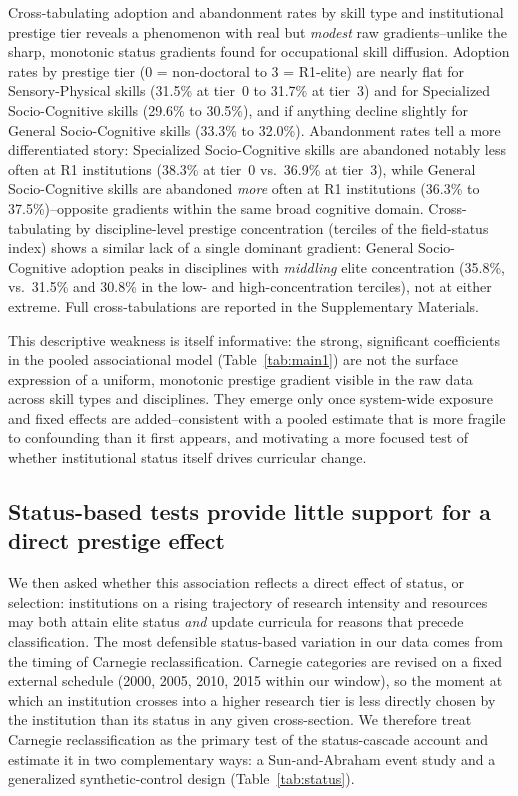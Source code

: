 \documentclass[11pt, letterpaper]{article}
\begin{document}
Cross-tabulating adoption and abandonment rates by skill type and institutional prestige tier reveals a phenomenon with real but \emph{modest} raw gradients--unlike the sharp, monotonic status gradients found for occupational skill diffusion. Adoption rates by prestige tier (0 = non-doctoral to 3 = R1-elite) are nearly flat for Sensory-Physical skills (31.5\% at tier~0 to 31.7\% at tier~3) and for Specialized Socio-Cognitive skills (29.6\% to 30.5\%), and if anything decline slightly for General Socio-Cognitive skills (33.3\% to 32.0\%). Abandonment rates tell a more differentiated story: Specialized Socio-Cognitive skills are abandoned notably less often at R1 institutions (38.3\% at tier~0 vs.\ 36.9\% at tier~3), while General Socio-Cognitive skills are abandoned \emph{more} often at R1 institutions (36.3\% to 37.5\%)--opposite gradients within the same broad cognitive domain. Cross-tabulating by discipline-level prestige concentration (terciles of the field-status index) shows a similar lack of a single dominant gradient: General Socio-Cognitive adoption peaks in disciplines with \emph{middling} elite concentration (35.8\%, vs.\ 31.5\% and 30.8\% in the low- and high-concentration terciles), not at either extreme. Full cross-tabulations are reported in the Supplementary Materials.

This descriptive weakness is itself informative: the strong, significant coefficients in the pooled associational model (Table~\ref{tab:main1}) are not the surface expression of a uniform, monotonic prestige gradient visible in the raw data across skill types and disciplines. They emerge only once system-wide exposure and fixed effects are added--consistent with a pooled estimate that is more fragile to confounding than it first appears, and motivating a more focused test of whether institutional status itself drives curricular change.

\subsection*{Status-based tests provide little support for a direct prestige effect}

We then asked whether this association reflects a direct effect of status, or selection: institutions on a rising trajectory of research intensity and resources may both attain elite status \emph{and} update curricula for reasons that precede classification. The most defensible status-based variation in our data comes from the timing of Carnegie reclassification. Carnegie categories are revised on a fixed external schedule (2000, 2005, 2010, 2015 within our window), so the moment at which an institution crosses into a higher research tier is less directly chosen by the institution than its status in any given cross-section. We therefore treat Carnegie reclassification as the primary test of the status-cascade account and estimate it in two complementary ways: a Sun-and-Abraham event study and a generalized synthetic-control design (Table~\ref{tab:status}).
\end{document}
